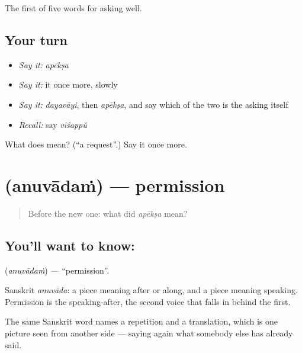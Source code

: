 \begin{grammarlens}[title={What you've built}]
The first of five words for asking well.
\end{grammarlens}

\subsection*{Your turn}
\begin{itemize}
\raggedright
  \item \emph{Say it:} \emph{apēkṣa}
  \item \emph{Say it:} it once more, slowly
  \item \emph{Say it:} \emph{dayavāyi}, then \emph{apēkṣa}, and say which of the two is the asking itself
  \item \emph{Recall:} say \emph{viśappŭ}
\end{itemize}

\begin{tcolorbox}[breakable,colback=teal!4,colframe=teal!35!black,title={Before you move on}]
What does  mean? (\textquotedblleft{}a request\textquotedblright{}.) Say it once more.
\end{tcolorbox}
\section[\texorpdfstring{\ml{അനുവാദം} (anuvādaṁ)}{അനുവാദം (anuvādaṁ)}]{ (anuvādaṁ) — permission}

\label{lesson:ML-C65-permission}



\begin{quote}
Before the new one: what did \emph{apēkṣa} mean?
\end{quote}

\subsection*{You'll want to know: }
\textbf{} (\emph{anuvādaṁ}) — \textquotedblleft{}permission\textquotedblright{}.

Sanskrit \emph{anuvāda}: a piece meaning after or along, and a piece meaning speaking. Permission is the speaking-after, the second voice that falls in behind the first.

The same Sanskrit word names a repetition and a translation, which is one picture seen from another side — saying again what somebody else has already said.

